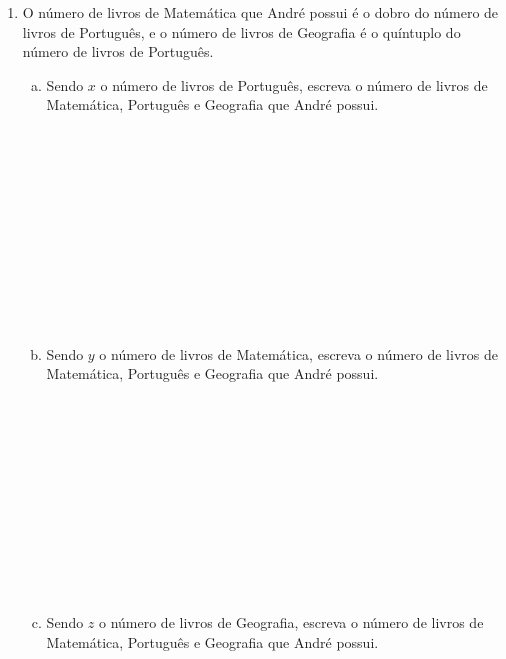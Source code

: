 \documentclass[a4paper,14pt]{article}
\begin{document}
\begin{multicols}{2}
\begin{enumerate}
			\\\\\\\\\\\\\\\\\\\\\\\\\\\\\\\\\\\\\\\\\\\\
			\item O número de livros de Matemática que André possui é o dobro do número de livros de Português, e o número de livros de Geografia é o quíntuplo do número de livros de Português.
			\begin{enumerate}[a)]
				\item Sendo $x$ o número de livros de Português, escreva o número de livros de Matemática, Português e Geografia que André possui. \\\\\\\\\\\\\\\\\\\\\\\\
				\item Sendo $y$ o número de livros de Matemática, escreva o número de livros de Matemática, Português e Geografia que André possui. \\\\\\\\\\\\\\\\\\\\\\\\
				\item Sendo $z$ o número de livros de Geografia, escreva o número de livros de Matemática, Português e Geografia que André possui. \\\\\\\\\\\\\\\\\\

\end{enumerate}
\end{enumerate}
\end{multicols}
\end{document}

